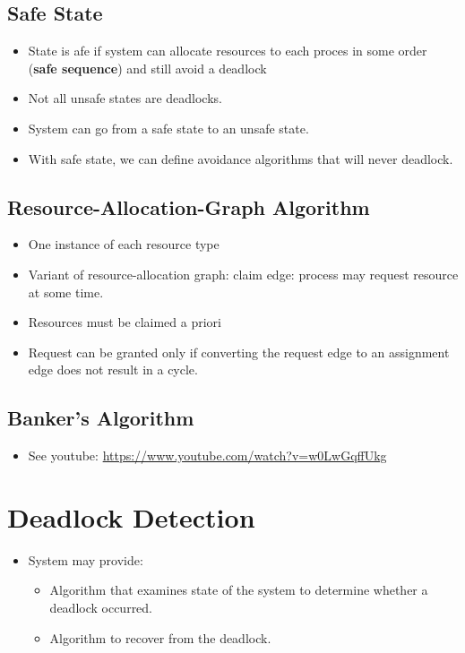 \documentclass[10pt]{report}
\begin{document}
		\subsection{Safe State}
			\begin{itemize}
				\item State is afe if system can allocate resources to each proces in some order (\textbf{safe sequence}) and still avoid a deadlock
				\item Not all unsafe states are deadlocks.
				\item System can go from a safe state to an unsafe state.
				\item With safe state, we can define avoidance algorithms that will never deadlock.
			\end{itemize}

		\subsection{Resource-Allocation-Graph Algorithm}
			\begin{itemize}
				\item One instance of each resource type
				\item Variant of resource-allocation graph: claim edge: process may request resource at some time.
				\item Resources must be claimed a priori
				\item Request can be granted only if converting the request edge to an assignment edge does not result in a cycle.
			\end{itemize}

		\subsection{Banker's Algorithm}
			\begin{itemize}
				\item See youtube: \url{https://www.youtube.com/watch?v=w0LwGqffUkg}
			\end{itemize}

	\section{Deadlock Detection}
		\begin{itemize}
			\item System may provide:
			\begin{itemize}
				\item Algorithm that examines state of the system to determine whether a deadlock occurred.
				\item Algorithm to recover from the deadlock.
			\end{itemize}
		\end{itemize}
\end{document}
